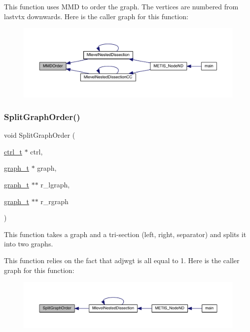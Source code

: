 This function uses M\+MD to order the graph. The vertices are numbered from lastvtx downwards. Here is the caller graph for this function\+:\nopagebreak
\begin{figure}[H]
\begin{center}
\leavevmode
\includegraphics[width=350pt]{a00933_acafb70c0e49cde8105dc62f6c34dfa6c_icgraph}
\end{center}
\end{figure}
\mbox{\label{a00933_a2554253b42e739ac3bb63e676741e1cd}} 
\subsubsection{\texorpdfstring{Split\+Graph\+Order()}{SplitGraphOrder()}}
{\footnotesize\ttfamily void Split\+Graph\+Order (\begin{DoxyParamCaption}\item[{\hyperlink{a00742}{ctrl\+\_\+t} $\ast$}]{ctrl,  }\item[{\hyperlink{a00734}{graph\+\_\+t} $\ast$}]{graph,  }\item[{\hyperlink{a00734}{graph\+\_\+t} $\ast$$\ast$}]{r\+\_\+lgraph,  }\item[{\hyperlink{a00734}{graph\+\_\+t} $\ast$$\ast$}]{r\+\_\+rgraph }\end{DoxyParamCaption})}

This function takes a graph and a tri-\/section (left, right, separator) and splits it into two graphs.

This function relies on the fact that adjwgt is all equal to 1. Here is the caller graph for this function\+:\nopagebreak
\begin{figure}[H]
\begin{center}
\leavevmode
\includegraphics[width=350pt]{a00933_a2554253b42e739ac3bb63e676741e1cd_icgraph}
\end{center}
\end{figure}
\mbox{\label{a00933_a52a083cfb474124f22728e79cfba695f}} 
